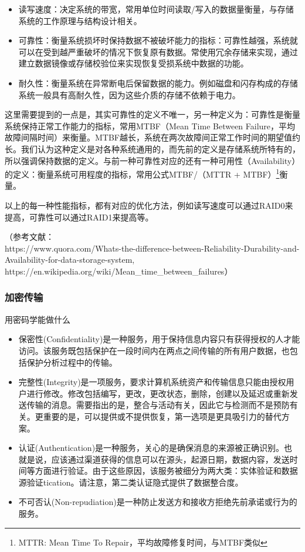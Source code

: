 \documentclass{ctexart}
\begin{document}
\begin{itemize}
    \item 读写速度：决定系统的带宽，常用单位时间读取/写入的数据量衡量，与存储系统的工作原理与结构设计相关。
    \item 可靠性：衡量系统损坏时保持数据不被破坏能力的指标：可靠性越强，系统就可以在受到越严重破坏的情况下恢复原有数据。常使用冗余存储来实现，通过建立数据镜像或存储校验位来实现恢复受损系统中数据的功能。
    \item 耐久性：衡量系统在异常断电后保留数据的能力。例如磁盘和闪存构成的存储系统一般具有高耐久性，因为这些介质的存储不依赖于电力。
\end{itemize}

这里需要提到的一点是，其实可靠性的定义不唯一，另一种定义为：可靠性是衡量系统保持正常工作能力的指标，常用MTBF（Mean Time Between Failure，平均故障间隔时间）来衡量。MTBF越长，系统在两次故障间正常工作时间的期望值约长。我们认为这种定义是对各种系统通用的，而先前的定义是存储系统所特有的，所以强调保持数据的定义。与前一种可靠性对应的还有一种可用性（Availability）的定义：衡量系统可用程度的指标，常用公式MTBF/（MTTR + MTBF）\footnote{MTTR: Mean Time To Repair，平均故障修复时间，与MTBF类似}衡量。

以上的每一种性能指标，都有对应的优化方法，例如读写速度可以通过RAID0来提高，可靠性可以通过RAID1来提高等。

（参考文献：\\
https://www.quora.com/Whats-the-difference-between-Reliability-Durability-and-Availability-for-data-storage-system, \\ https://en.wikipedia.org/wiki/Mean\_time\_between\_failures）

\subsubsection{加密传输}
用密码学能做什么
\begin{itemize}
	\item 保密性(Confidentiality)是一种服务，用于保持信息内容只有获得授权的人才能访问。该服务既包括保护在一段时间内在两点之间传输的所有用户数据，也包括保护分析过程中的传输。
	\item 完整性(Integrity)是一项服务，要求计算机系统资产和传输信息只能由授权用户进行修改。修改包括编写，更改，更改状态，删除，创建以及延迟或重新发送传输的消息。需要指出的是，整合与活动有关，因此它与检测而不是预防有关。更重要的是，可以提供或不提供恢复，第一选项是更具吸引力的替代方案。
	\item 认证(Authentication)是一种服务，关心的是确保消息的来源被正确识别。也就是说，应该通过渠道获得的信息可以在源头，起源日期，数据内容，发送时间等方面进行验证。由于这些原因，该服务被细分为两大类：实体验证和数据源验证tication。请注意，第二类认证隐式提供了数据整合度。
	\item 不可否认(Non-repudiation)是一种防止发送方和接收方拒绝先前承诺或行为的服务。
\end{itemize}
\end{document}
